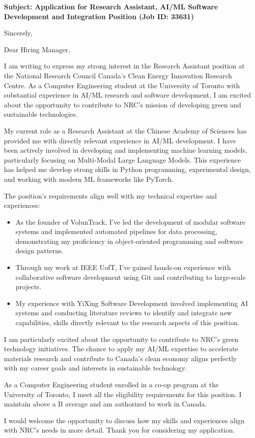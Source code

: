 \documentclass[11pt,a4paper,roman]{moderncv}
\begin{document}
\date{\today}
\opening{\textbf{Subject: Application for Research Assistant, AI/ML Software Development and Integration Position (Job ID: 33631)}}
\closing{Sincerely,}

\makelettertitle

Dear Hiring Manager,

I am writing to express my strong interest in the Research Assistant position at the National Research Council Canada's Clean Energy Innovation Research Centre. As a Computer Engineering student at the University of Toronto with substantial experience in AI/ML research and software development, I am excited about the opportunity to contribute to NRC's mission of developing green and sustainable technologies.

My current role as a Research Assistant at the Chinese Academy of Sciences has provided me with directly relevant experience in AI/ML development. I have been actively involved in developing and implementing machine learning models, particularly focusing on Multi-Modal Large Language Models. This experience has helped me develop strong skills in Python programming, experimental design, and working with modern ML frameworks like PyTorch.

The position's requirements align well with my technical expertise and experiences:

\begin{itemize}
\item As the founder of VolunTrack, I've led the development of modular software systems and implemented automated pipelines for data processing, demonstrating my proficiency in object-oriented programming and software design patterns.
\item Through my work at IEEE UofT, I've gained hands-on experience with collaborative software development using Git and contributing to large-scale projects.
\item My experience with YiXing Software Development involved implementing AI systems and conducting literature reviews to identify and integrate new capabilities, skills directly relevant to the research aspects of this position.
\end{itemize}

I am particularly excited about the opportunity to contribute to NRC's green technology initiatives. The chance to apply my AI/ML expertise to accelerate materials research and contribute to Canada's clean economy aligns perfectly with my career goals and interests in sustainable technology.

As a Computer Engineering student enrolled in a co-op program at the University of Toronto, I meet all the eligibility requirements for this position. I maintain above a B average and am authorized to work in Canada.

I would welcome the opportunity to discuss how my skills and experiences align with NRC's needs in more detail. Thank you for considering my application.

\makeletterclosing
\end{document}
